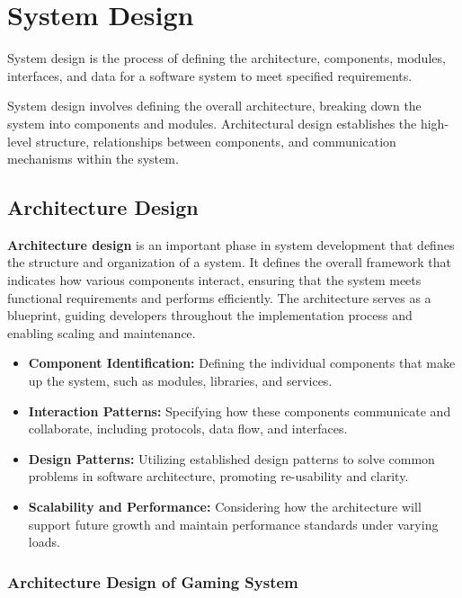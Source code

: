 \chapter{System Design}

System design is the process of defining the \cite {hocking2022unity} architecture, components, modules, interfaces, and data for a software system to meet specified requirements.

System design involves defining the overall architecture, breaking down the system into components and modules. Architectural design establishes the high-level structure, relationships between components, and communication mechanisms within the system.

\section{Architecture Design}
\textbf{Architecture design} is an important phase in system development that defines the structure and organization of a system. It defines the overall framework that indicates how various components interact, ensuring that the system meets functional requirements and performs efficiently. The architecture serves as a blueprint, guiding developers throughout the implementation process and enabling scaling and maintenance.

\begin{itemize}
\item \textbf{Component Identification:} Defining the individual components that make up the system, such as modules, libraries, and services.
\item  \textbf{Interaction Patterns:} Specifying how these components communicate and collaborate, including protocols, data flow, and interfaces.
\item \textbf{Design Patterns:} Utilizing established design patterns to solve common problems in software architecture, promoting re-usability and clarity.
\item \textbf{Scalability and Performance:} Considering how the architecture will support future growth and maintain performance standards under varying loads.
\end{itemize}
\subsection{Architecture Design of Gaming System}
